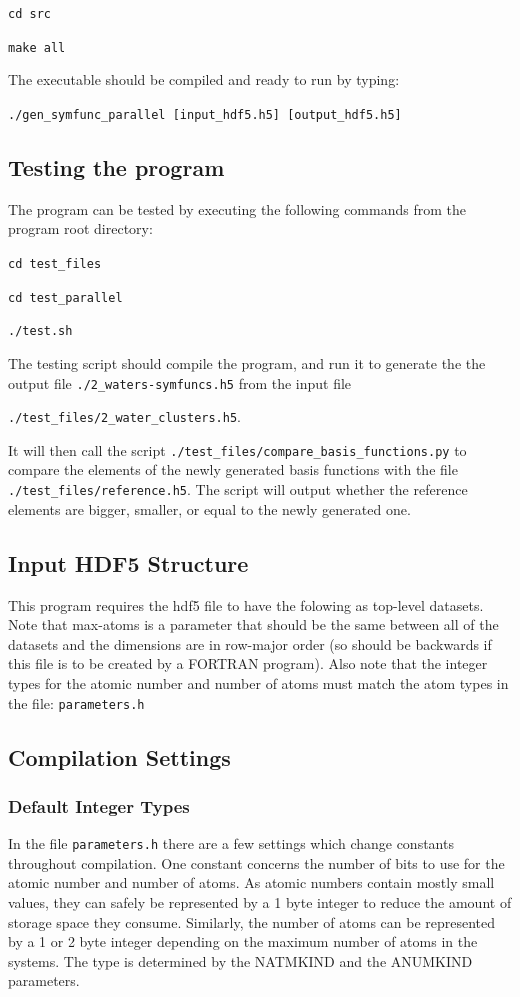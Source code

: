 \documentclass{article}
\begin{document}
\texttt{cd src}

\texttt{make all}

The executable should be compiled and ready to run by typing:

\texttt{./gen\_symfunc\_parallel [input\_hdf5.h5] [output\_hdf5.h5]}

\subsection{Testing the program}
The program can be tested by executing the following commands from the program root directory:

\texttt{cd test\_files}

\texttt{cd test\_parallel}

\texttt{./test.sh}

The testing script should compile the program, and run it to generate the the output file \texttt{./2\_waters-symfuncs.h5} from the input file

\texttt{./test\_files/2\_water\_clusters.h5}.

 It will then call the script \texttt{./test\_files/compare\_basis\_functions.py} to compare the elements of the newly generated basis functions with the file \texttt{./test\_files/reference.h5}. The script will output whether the reference elements are bigger, smaller, or equal to the newly generated one.
 
\subsection{Input HDF5 Structure}
This program requires the hdf5 file to have the folowing as top-level datasets.
Note that max-atoms is a parameter that should be the same between all of the datasets and the dimensions are in row-major order (so should be backwards if this file is to be created by a FORTRAN program).
Also note that the integer types for the atomic number and number of atoms must match the atom types in the file: \texttt{parameters.h}

\subsection{Compilation Settings}
\subsubsection{Default Integer Types}
In the file \texttt{parameters.h} there are a few settings which change constants throughout compilation.
One constant concerns the number of bits to use for the atomic number and number of atoms.
As atomic numbers contain mostly small values, they can safely be represented by a 1 byte integer to reduce the amount of storage space they consume.
Similarly, the number of atoms can be represented by a 1 or 2 byte integer depending on the maximum number of atoms in the systems.
The type is determined by the NATMKIND and the ANUMKIND parameters.
\end{document}
